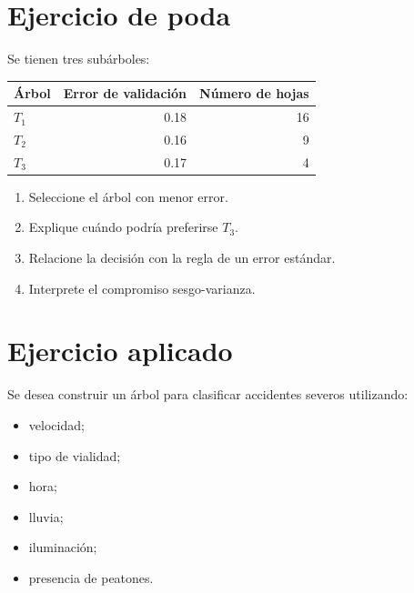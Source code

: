 \documentclass[
  spanish,
  10.5pt,
  letterpaper,
  DIV=11,
  numbers=noendperiod,
  oneside,
  open=any]{scrreprt}
\newcounter{none} %
\providecommand{\tightlist}{%
  \setlength{\itemsep}{0pt}\setlength{\parskip}{0pt}}
\theoremstyle{definition}
\theoremstyle{definition}
\theoremstyle{plain}
\theoremstyle{remark}
\begin{document}
\section*{Ejercicio de poda}\label{ejercicio-de-poda}


Se tienen tres subárboles:

{\def\LTcaptype{none} %
\begin{longtable}[]{@{}lrr@{}}
\toprule\noalign{}
Árbol & Error de validación & Número de hojas \\
\midrule\noalign{}
\endhead
\bottomrule\noalign{}
\endlastfoot
\(T_1\) & 0.18 & 16 \\
\(T_2\) & 0.16 & 9 \\
\(T_3\) & 0.17 & 4 \\
\end{longtable}
}

\begin{enumerate}
\def\labelenumi{\arabic{enumi}.}
\tightlist
\item
  Seleccione el árbol con menor error.
\item
  Explique cuándo podría preferirse \(T_3\).
\item
  Relacione la decisión con la regla de un error estándar.
\item
  Interprete el compromiso sesgo-varianza.
\end{enumerate}

\section*{Ejercicio aplicado}\label{ejercicio-aplicado-9}


Se desea construir un árbol para clasificar accidentes severos
utilizando:

\begin{itemize}
\tightlist
\item
  velocidad;
\item
  tipo de vialidad;
\item
  hora;
\item
  lluvia;
\item
  iluminación;
\item
  presencia de peatones.
\end{itemize}
\end{document}
